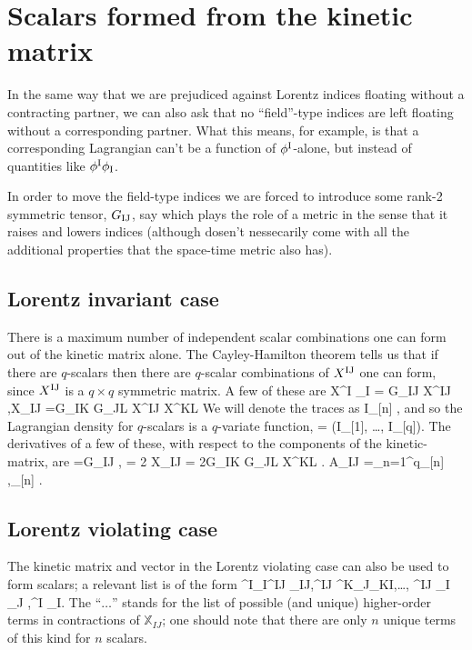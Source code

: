 \documentclass[amsmath,amssymb,12pt,eqsecnum]{article}
\newcommand{\fiu}[2]{#1^{\scriptsize\rm #2 }}
\newcommand{\fid}[2]{#1_{\rm #2 }}
\begin{document}
\section{Scalars formed from the kinetic matrix}
In the same way that we are prejudiced against     Lorentz indices floating without a contracting partner, we can also ask that no ``field''-type indices are left floating without a corresponding partner. What this means, for example, is that a corresponding Lagrangian can't be a function of $\fiu{\phi}{I}$-alone, but instead of quantities like $\fiu{\phi}{I}\fid{\phi}{I}$.

In order to move the field-type indices we are forced to introduce some rank-2 symmetric tensor, $\fid{G}{IJ}$, say which plays the role of a metric in the sense that it raises and lowers indices (although dosen't nessecarily come with all the additional properties that the space-time metric also has).


\subsection{Lorentz invariant case}

There is a maximum number of independent scalar combinations one can form out of the kinetic matrix alone. The Cayley-Hamilton theorem tells us that if there are $q$-scalars then there are $q$-scalar combinations of $\fiu{X}{IJ}$  one can form, since $\fiu{X}{IJ}$ is a $q\times q$ symmetric matrix. A few of these are
\bea
[\rbm{X}]  \fiu{X}{I}{}\fid{}{I} = \fid{G}{IJ}\fiu{X}{IJ},\qquad [\rbm{X}^2]\defn {\fiu{X}{IJ}}\fid{X}{IJ} =\fid{G}{IK}\fid{G}{JL}\fiu{X}{IJ}\fiu{X}{KL}
\eea
We will  denote the traces as
\bea
I_{[n]} ,
\eea
and so the Lagrangian density for $q$-scalars is a $q$-variate function,
\bea
\ld = \ld(I_{[1]}, \ldots, I_{[q]}).
\eea
The derivatives of a few of these, with respect to the components of the kinetic-matrix, are
\bea
\pd{I_{[1]}}{\fiu{X}{IJ}} =\fid{G}{IJ},\qquad  \pd{I_{[2]}}{\fiu{X}{IJ}} = 2 \fid{X}{IJ} = 2\fid{G}{IK}\fid{G}{JL}\fiu{X}{KL}.
\eea
\bea
\fid{A}{IJ} =\sum_{n=1}^q\alpha_{[n]}\pd{I_{[n]}}{\fiu{X}{IJ}} ,\qquad \alpha_{[n]}   {}.
\eea

\subsection{Lorentz violating case}
The kinetic matrix and vector in the Lorentz violating case can also be used to form scalars; a relevant list is of the form
\bea
{}^I{}_{I}\qquad \fiu{\mathbb{X}}{IJ}_{IJ},\qquad \fiu{\mathbb{X}}{IJ}^K{}_{J}_{KI},\qquad \ldots, \qquad  \fiu{}{IJ}_I _J ,\qquad \fiu{\mathbb{Y}}{I}_I.
\eea
The ``$\ldots$'' stands for the  list of possible (and unique) higher-order terms in contractions of $\mathbb{X}{}_{IJ}$; one should note that there are only $n$ unique terms of this kind for $n$ scalars.
\end{document}
